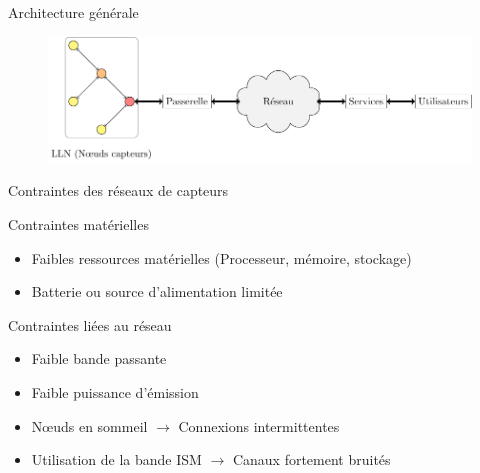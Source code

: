 \begin{frame}{Architecture générale}
  \begin{figure}
    \centering
    \includegraphics[scale=.75]{figures/architecture_general_slides.pdf}
  \end{figure}


\end{frame}

\begin{frame}{Contraintes des réseaux de capteurs}

  \begin{block}{Contraintes matérielles}
    \begin{itemize}
      \item Faibles ressources matérielles (Processeur, mémoire, stockage)
      \item Batterie ou source d'alimentation limitée
    \end{itemize}
  \end{block}  

  \begin{block}{Contraintes liées au réseau}
    \begin{itemize}
      \item Faible bande passante
      \item Faible puissance d'émission
      \item Nœuds en sommeil $\to$ Connexions intermittentes
      \item Utilisation de la bande ISM $\to$ Canaux fortement bruités
    \end{itemize}
  \end{block}

\end{frame}

